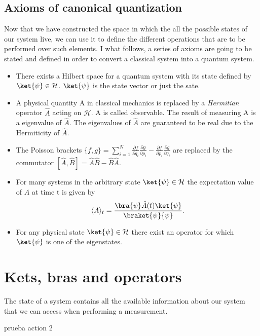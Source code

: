 \documentclass{article}
\begin{document}
\subsection{Axioms of canonical quantization}
Now that we have constructed the space in which the all the possible states of our system live, we can use it to define the different operations that are to be performed over such elements. I what follows, a series of axioms are going to be stated and defined in order to convert a classical system into a quantum system.

\begin{itemize}
  \item [A1.] There exists a Hilbert space for a quantum system with its state defined by $\ket{\psi} \in \mathcal{H}$. $\ket{\psi}$ is the state vector or just the sate.
  \item [A2.] A physical quantity A in classical mechanics is replaced by a \textit{Hermitian} operator $\hat{A}$ acting on $\mathcal{H}$. A is called observable. The result of measuring A is a eigenvalue of $\hat{A}$. The eigenvalues of $\hat{A}$ are guaranteed to be real due to the Hermiticity of $\hat{A}$.
  \item [A3.] The Poisson brackets $\{f,g\}=\sum_{i=1}^N\frac{\partial f}{\partial q_i}\frac{\partial g}{\partial p_i}-\frac{\partial f}{\partial p_i}\frac{\partial g}{\partial q_i}$ are replaced by the commutator $[\hat{A},\hat{B}]=\hat{A}\hat{B} - \hat{B}\hat{A}$.
  \item [A4.]{ For many systems in the arbitrary state $\ket{\psi} \in \mathcal{H}$ the expectation value of $\hat{A}$ at time t is given by
  \begin{align}
    \langle A \rangle_t =\frac{\bra{\psi}\hat{A}(t)\ket{\psi}}{\braket{\psi}{\psi}}.
  \end{align}
  }
  \item [A5.] For any physical state $\ket{\psi} \in \mathcal{H}$ there exist an operator for which $\ket{\psi}$ is one of the eigenstates.
\end{itemize}
\section{Kets, bras and operators}
The state of a system contains all the available information about our system that we can access when performing a measurement.

prueba action 2
\end{document}
